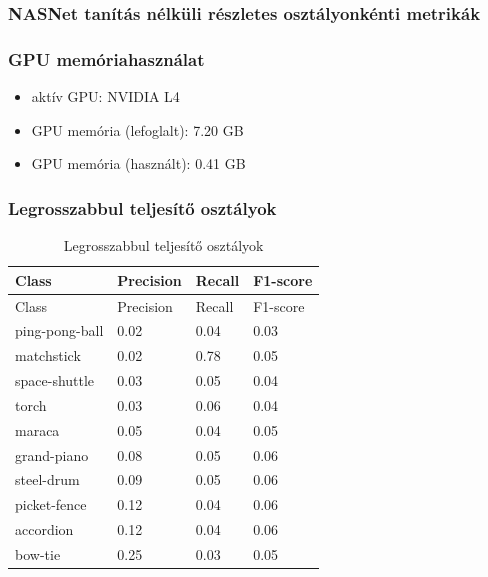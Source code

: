 \subsubsection{NASNet tanítás nélküli részletes osztályonkénti metrikák}
  

\subsubsection{GPU memóriahasználat}
\begin{itemize}
  \item aktív GPU: NVIDIA L4
  \item GPU memória (lefoglalt): 7.20 GB
  \item GPU memória (használt):  0.41 GB
\end{itemize}

\subsubsection{Legrosszabbul teljesítő osztályok}
\begin{center}
  \begin{longtable}{llll}
  \caption{Legrosszabbul teljesítő osztályok}\label{tab:phase01_NASNet_legrosszabb_osztlyok}\\
  \toprule
  Class & Precision & Recall & F1-score \\
  \midrule
  \endfirsthead
  \toprule
  Class & Precision & Recall & F1-score \\
  \midrule
  \endhead
  ping-pong-ball & 0.02 & 0.04 & 0.03 \\
  matchstick & 0.02 & 0.78 & 0.05 \\
  space-shuttle & 0.03 & 0.05 & 0.04 \\
  torch & 0.03 & 0.06 & 0.04 \\
  maraca & 0.05 & 0.04 & 0.05 \\
  grand-piano & 0.08 & 0.05 & 0.06 \\
  steel-drum & 0.09 & 0.05 & 0.06 \\
  picket-fence & 0.12 & 0.04 & 0.06 \\
  accordion & 0.12 & 0.04 & 0.06 \\
  bow-tie & 0.25 & 0.03 & 0.05 \\
  \bottomrule
  \end{longtable}
  \end{center}
  